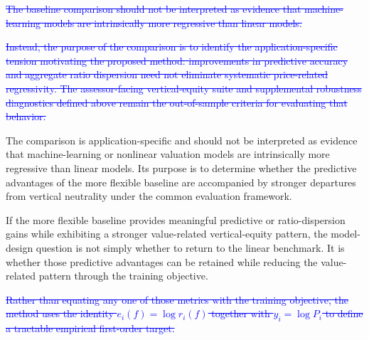 \documentclass[10pt]{article}
\theoremstyle{definition}
\newcommand{\1}{\mathbf{1}}
\begin{document}
{{}


\textcolor{blue}{\sout{The baseline comparison should not be interpreted as evidence that machine-learning models are intrinsically more regressive than linear models.}}

\textcolor{blue}{\sout{Instead, the purpose of the comparison is to identify the application-specific tension motivating the proposed method: improvements in predictive accuracy and aggregate ratio dispersion need not eliminate systematic price-related regressivity. The assessor-facing vertical-equity suite and supplemental robustness diagnostics defined above remain the out-of-sample criteria for evaluating that behavior.}}

{\color{impGreen}

The comparison is application-specific and should not be interpreted as
evidence that machine-learning or nonlinear valuation models are intrinsically
more regressive than linear models. Its purpose is to determine whether the
predictive advantages of the more flexible baseline are accompanied by
stronger departures from vertical neutrality under the common evaluation
framework.


If the more flexible baseline provides meaningful predictive or ratio-dispersion
gains while exhibiting a stronger value-related vertical-equity pattern, the
model-design question is not simply whether to return to the linear benchmark.
It is whether those predictive advantages can be retained while reducing the
value-related pattern through the training objective.

}



\textcolor{blue}{\sout{Rather than equating any one of those metrics with the training objective, the method uses the identity $e_i(f)=\log r_i(f)$ together with $y_i=\log P_i$ to define a tractable empirical first-order target.}}

}
\end{document}
